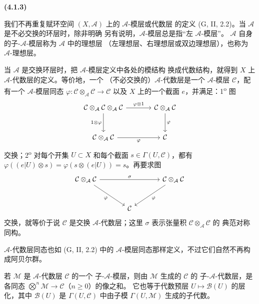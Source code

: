 \documentclass[UTF8,fontset=none,11pt,oneside,openany]{ctexbook}
\newenvironment{env}[1][]{%
  \par\medskip\noindent\textbf{(#1)}\ %
}{\par}
\newcommand{\oldpage}[2][]{%
  \hypertarget{ega-source-page-#1-#2}{}%
  \marginnote{\scriptsize\textbf{#1}~|~#2}\ignorespaces}
\let\EGAOriginalLabel\label
\renewcommand{\label}[1]{\phantomsection\EGAOriginalLabel{#1}}
\begin{document}
\begin{env}[4.1.3]
\label{0.4.1.3-fr}
我们不再重复赋环空间 $(X,\mathcal{A})$ 上的 $\mathcal{A}$-模层或代数层
的定义 (G, II, 2.2)。当 $\mathcal{A}$ 是不必交换的环层时，除非明确
另有说明，$\mathcal{A}$-模层总是指“左 $\mathcal{A}$-模层”。
$\mathcal{A}$ 自身的子-$\mathcal{A}$-模层称为 $\mathcal{A}$ 中的理想层
（左理想层、右理想层或双边理想层），也称为 $\mathcal{A}$-理想层。

当 $\mathcal{A}$ 是交换环层时，把 $\mathcal{A}$-模层定义中各处的模结构
换成代数结构，就得到 $X$ 上 $\mathcal{A}$-代数层的定义。等价地，一个
（不必交换的）$\mathcal{A}$-代数层是一个 $\mathcal{A}$-模层
$\mathcal{C}$，配有一个 $\mathcal{A}$-模层同态
$\varphi:\mathcal{C}\otimes_{\mathcal{A}}\mathcal{C}\to\mathcal{C}$
以及 $X$ 上的一个截面 $e$，并满足：1\textsuperscript{o} 图
\oldpage[0\textsubscript{I}]{37}
\[
\begin{tikzcd}[column sep=large,row sep=large]
\mathcal{C}\otimes_{\mathcal{A}}\mathcal{C}\otimes_{\mathcal{A}}\mathcal{C}
  \arrow[r,"\varphi\otimes 1"]
  \arrow[d,"1\otimes\varphi"']
&
\mathcal{C}\otimes_{\mathcal{A}}\mathcal{C}
  \arrow[d,"\varphi"]
\\
\mathcal{C}\otimes_{\mathcal{A}}\mathcal{C}
  \arrow[r,"\varphi"']
&
\mathcal{C}
\end{tikzcd}
\]
交换；2\textsuperscript{o} 对每个开集 $U\subset X$ 和每个截面
$s\in\Gamma(U,\mathcal{C})$，都有
$\varphi((e|U)\otimes s)=\varphi(s\otimes(e|U))=s$。再要求图
\[
\begin{tikzcd}[column sep=large,row sep=large]
\mathcal{C}\otimes_{\mathcal{A}}\mathcal{C}
  \arrow[rr,"\sigma"]
  \arrow[dr,"\varphi"']
&&
\mathcal{C}\otimes_{\mathcal{A}}\mathcal{C}
  \arrow[dl,"\varphi"]
\\
& \mathcal{C} &
\end{tikzcd}
\]
交换，就等价于说 $\mathcal{C}$ 是交换 $\mathcal{A}$-代数层；这里
$\sigma$ 表示张量积 $\mathcal{C}\otimes_{\mathcal{A}}\mathcal{C}$ 的
典范对称同构。

$\mathcal{A}$-代数层同态也如 (G, II, 2.2) 中的
$\mathcal{A}$-模层同态那样定义，不过它们自然不再构成阿贝尔群。

若 $\mathcal{M}$ 是 $\mathcal{A}$-代数层 $\mathcal{C}$ 的一个
子-$\mathcal{A}$-模层，则由 $\mathcal{M}$ 生成的 $\mathcal{C}$ 的
子-$\mathcal{A}$-代数层，是各同态
$\bigotimes^n\mathcal{M}\to\mathcal{C}$（$n\geqslant0$）的像之和。
它也等于代数预层 $U\mapsto\mathcal{B}(U)$ 的层化，其中
$\mathcal{B}(U)$ 是 $\Gamma(U,\mathcal{C})$ 中由子模
$\Gamma(U,\mathcal{M})$ 生成的子代数。
\end{env}
\end{document}
